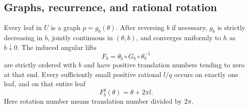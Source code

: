 \subsection{Graphs, recurrence, and rational rotation}

\begin{proposition}\label{prop:graph-collar}
Every leaf in $U$ is a graph $p=g_b(\theta)$.  After reversing $b$ if
necessary, $g_b$ is strictly decreasing in $b$, jointly continuous in
$(\theta,b)$, and converges uniformly to $h$ as $b\downarrow0$.
The induced angular lifts
\[
 F_b=\theta_b\circ G_b\circ\theta_b^{-1}
\]
are strictly ordered with $b$ and have positive translation numbers
tending to zero at that end.  Every sufficiently small positive rational
$l/q$ occurs on exactly one leaf, and on that entire leaf
\begin{equation}\label{geo:rational-periodicity}
 F_b^q(\theta)=\theta+2\pi l.
\end{equation}
Here rotation number means translation number divided by $2\pi$.
\end{proposition}

